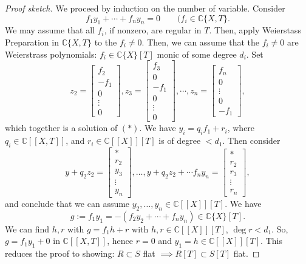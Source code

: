 \documentclass[12pt]{article}
\theoremstyle{theorem}            %
\theoremstyle{definition}           %
\theoremstyle{empty}
\begin{document}
\begin{proof}[Proof sketch] We proceed by induction on the number of variable.  Consider
\begin{equation}f_1y_1+\cdots + f_n y_n = 0 \qquad (f_i\in \mathds{C}\{X, T\}. \tag{$*$} \end{equation}
We may assume that all $f_i$, if nonzero, are regular in $T$.  Then, apply Weierstass Preparation in $\mathds{C}\{X, T\}$ to the $f_i\neq 0$.  Then, we can assume that the $f_i\neq0$ are Weierstrass polynomials: $f_i\in \mathds{C}\{X\}[T]$ monic of some degree $d_i$.  Set
$$z_2 = \left [ \begin{array}{c} f_2 \\ -f_1 \\ 0 \\ \vdots \\ 0 \end{array} \right ], z_3= \left [ \begin{array}{c} f_3 \\ 0 \\ -f_1 \\ 0 \\ \vdots \\ 0 \end{array} \right ], \cdots, z_n= \left [ \begin{array}{c} f_n \\ 0 \\ \vdots \\ 0 \\ -f_1\end{array} \right ],$$
which together is a solution of $(*)$.  We have $y_i=q_if_1+r_i$, where $q_i\in \mathds{C}[[X, T]]$, and $r_i\in \mathds{C}[[X]][T]$ is of degree $<d_1$.  Then consider
$$y+q_2z_2= \left [ \begin{array}{c} * \\ r_2 \\ y_3 \\ \vdots \\ y_n \end{array} \right ], \dots , y+q_2z_2+\cdots f_ny_n= \left [ \begin{array}{c} * \\ r_2\\ r_3 \\ \vdots \\ r_n \end{array} \right ],$$
and conclude that we can assume $y_2, \dots, y_n\in \mathds{C}[[X]][T]$.   We have
$$g:= f_1y_1 = -(f_2y_2+\cdots + f_ny_n)\in \mathds{C}\{X\}[T].$$
We can find $h, r$ with $g=f_1h+r$ with $h, r\in \mathds{C}[[X]][T]$, $\deg r<d_1$.  So, $g=f_1y_1+0$ in $\mathds{C}[[X, T]]$, hence $r=0$ and $y_1=h\in \mathds{C}[[X]][T]$.  This reduces the proof to showing: $R\subset S$ flat $\implies R[T]\subset S[T]$ flat.
\end{proof}
\end{document}
